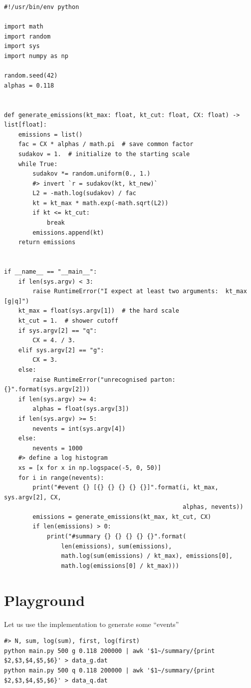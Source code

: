 \documentclass[11pt]{article}
\begin{document}
\begin{verbatim}
#!/usr/bin/env python

import math
import random
import sys
import numpy as np

random.seed(42)
alphas = 0.118


def generate_emissions(kt_max: float, kt_cut: float, CX: float) -> list[float]:
    emissions = list()
    fac = CX * alphas / math.pi  # save common factor
    sudakov = 1.  # initialize to the starting scale
    while True:
        sudakov *= random.uniform(0., 1.)
        #> invert `r = sudakov(kt, kt_new)`
        L2 = -math.log(sudakov) / fac
        kt = kt_max * math.exp(-math.sqrt(L2))
        if kt <= kt_cut:
            break
        emissions.append(kt)
    return emissions


if __name__ == "__main__":
    if len(sys.argv) < 3:
        raise RuntimeError("I expect at least two arguments:  kt_max [g|q]")
    kt_max = float(sys.argv[1])  # the hard scale
    kt_cut = 1.  # shower cutoff
    if sys.argv[2] == "q":
        CX = 4. / 3.
    elif sys.argv[2] == "g":
        CX = 3.
    else:
        raise RuntimeError("unrecognised parton: {}".format(sys.argv[2]))
    if len(sys.argv) >= 4:
        alphas = float(sys.argv[3])
    if len(sys.argv) >= 5:
        nevents = int(sys.argv[4])
    else:
        nevents = 1000
    #> define a log histogram
    xs = [x for x in np.logspace(-5, 0, 50)]
    for i in range(nevents):
        print("#event {} [{} {} {} {} {}]".format(i, kt_max, sys.argv[2], CX,
                                                  alphas, nevents))
        emissions = generate_emissions(kt_max, kt_cut, CX)
        if len(emissions) > 0:
            print("#summary {} {} {} {} {}".format(
                len(emissions), sum(emissions),
                math.log(sum(emissions) / kt_max), emissions[0],
                math.log(emissions[0] / kt_max)))
\end{verbatim}

\section{Playground}
\label{sec:org1edfcf6}
Let us use the implementation to generate some ``events''
\begin{verbatim}
#> N, sum, log(sum), first, log(first)
python main.py 500 g 0.118 200000 | awk '$1~/summary/{print $2,$3,$4,$5,$6}' > data_g.dat
python main.py 500 q 0.118 200000 | awk '$1~/summary/{print $2,$3,$4,$5,$6}' > data_q.dat
\end{verbatim}
\end{document}
